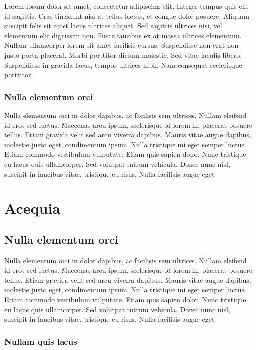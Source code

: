 Lorem ipsum dolor sit amet, consectetur adipiscing elit. Integer tempus quis elit id sagittis. Cras tincidunt nisi at tellus luctus, et congue dolor posuere. Aliquam suscipit felis sit amet lacus ultrices aliquet. Sed sagittis ultrices nisi, vel elementum elit dignissim non. Fusce faucibus ex at massa ultrices elementum. Nullam ullamcorper lorem sit amet facilisis cursus. Suspendisse non erat non justo porta placerat. Morbi porttitor dictum molestie. Sed vitae iaculis libero. Suspendisse in gravida lacus, tempor ultrices nibh. Nam consequat scelerisque porttitor.

\subsubsection{Nulla elementum orci}

Nulla elementum orci in dolor dapibus, ac facilisis sem ultrices. Nullam eleifend id eros sed luctus. Maecenas arcu ipsum, scelerisque id lorem in, placerat posuere tellus. Etiam gravida velit sed arcu viverra dapibus. Mauris vitae augue dapibus, molestie justo eget, condimentum ipsum. Nulla tristique mi eget semper luctus. Etiam commodo vestibulum vulputate. Etiam quis sapien dolor. Nunc tristique eu lacus quis ullamcorper. Sed volutpat rutrum vehicula. Donec nunc nisl, suscipit in faucibus vitae, tristique eu risus. Nulla facilisis augue eget


\section{Acequia}

\subsection{Nulla elementum orci}

Nulla elementum orci in dolor dapibus, ac facilisis sem ultrices. Nullam eleifend id eros sed luctus. Maecenas arcu ipsum, scelerisque id lorem in, placerat posuere tellus. Etiam gravida velit sed arcu viverra dapibus. Mauris vitae augue dapibus, molestie justo eget, condimentum ipsum. Nulla tristique mi eget semper luctus. Etiam commodo vestibulum vulputate. Etiam quis sapien dolor. Nunc tristique eu lacus quis ullamcorper. Sed volutpat rutrum vehicula. Donec nunc nisl, suscipit in faucibus vitae, tristique eu risus. Nulla facilisis augue eget


\subsubsection{Nullam quis lacus}

